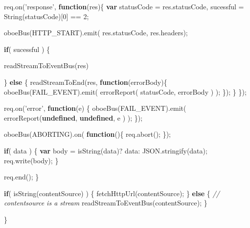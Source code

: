 \documentclass[12pt, ]{article}
\newenvironment{Shaded}{}{}
\newcommand{\KeywordTok}[1]{\textcolor[rgb]{0.00,0.44,0.13}{\textbf{{#1}}}}
\newcommand{\DecValTok}[1]{\textcolor[rgb]{0.25,0.63,0.44}{{#1}}}
\newcommand{\StringTok}[1]{\textcolor[rgb]{0.25,0.44,0.63}{{#1}}}
\newcommand{\CommentTok}[1]{\textcolor[rgb]{0.38,0.63,0.69}{\textit{{#1}}}}
\newcommand{\OtherTok}[1]{\textcolor[rgb]{0.00,0.44,0.13}{{#1}}}
\newcommand{\FunctionTok}[1]{\textcolor[rgb]{0.02,0.16,0.49}{{#1}}}
\newcommand{\NormalTok}[1]{{#1}}
\begin{document}
\begin{Shaded}
\begin{Highlighting}[]
      \OtherTok{req}\NormalTok{.}\FunctionTok{on}\NormalTok{(}\StringTok{'response'}\NormalTok{, }\KeywordTok{function}\NormalTok{(res)\{}
         \KeywordTok{var} \NormalTok{statusCode = }\OtherTok{res}\NormalTok{.}\FunctionTok{statusCode}\NormalTok{,}
             \NormalTok{sucessful = }\FunctionTok{String}\NormalTok{(statusCode)[}\DecValTok{0}\NormalTok{] == }\DecValTok{2}\NormalTok{;}
                                                   
         \FunctionTok{oboeBus}\NormalTok{(HTTP_START).}\FunctionTok{emit}\NormalTok{( }\OtherTok{res}\NormalTok{.}\FunctionTok{statusCode}\NormalTok{, }\OtherTok{res}\NormalTok{.}\FunctionTok{headers}\NormalTok{);                                }
                                
         \KeywordTok{if}\NormalTok{( sucessful ) \{          }
               
            \FunctionTok{readStreamToEventBus}\NormalTok{(res)}
            
         \NormalTok{\} }\KeywordTok{else} \NormalTok{\{}
            \FunctionTok{readStreamToEnd}\NormalTok{(res, }\KeywordTok{function}\NormalTok{(errorBody)\{}
               \FunctionTok{oboeBus}\NormalTok{(FAIL_EVENT).}\FunctionTok{emit}\NormalTok{( }
                  \FunctionTok{errorReport}\NormalTok{( statusCode, errorBody )}
               \NormalTok{);}
            \NormalTok{\});}
         \NormalTok{\}      }
      \NormalTok{\});}
      
      \OtherTok{req}\NormalTok{.}\FunctionTok{on}\NormalTok{(}\StringTok{'error'}\NormalTok{, }\KeywordTok{function}\NormalTok{(e) \{}
         \FunctionTok{oboeBus}\NormalTok{(FAIL_EVENT).}\FunctionTok{emit}\NormalTok{( }
            \FunctionTok{errorReport}\NormalTok{(}\KeywordTok{undefined}\NormalTok{, }\KeywordTok{undefined}\NormalTok{, e )}
         \NormalTok{);}
      \NormalTok{\});}
      
      \FunctionTok{oboeBus}\NormalTok{(ABORTING).}\FunctionTok{on}\NormalTok{( }\KeywordTok{function}\NormalTok{()\{              }
         \OtherTok{req}\NormalTok{.}\FunctionTok{abort}\NormalTok{();}
      \NormalTok{\});}
         
      \KeywordTok{if}\NormalTok{( data ) \{}
         \KeywordTok{var} \NormalTok{body = }\FunctionTok{isString}\NormalTok{(data)? data: }\OtherTok{JSON}\NormalTok{.}\FunctionTok{stringify}\NormalTok{(data);}
         \OtherTok{req}\NormalTok{.}\FunctionTok{write}\NormalTok{(body);}
      \NormalTok{\}}
      
      \OtherTok{req}\NormalTok{.}\FunctionTok{end}\NormalTok{();         }
   \NormalTok{\}}
   
   \KeywordTok{if}\NormalTok{( }\FunctionTok{isString}\NormalTok{(contentSource) ) \{}
      \FunctionTok{fetchHttpUrl}\NormalTok{(contentSource);}
   \NormalTok{\} }\KeywordTok{else} \NormalTok{\{}
      \CommentTok{// contentsource is a stream}
      \FunctionTok{readStreamToEventBus}\NormalTok{(contentSource);   }
   \NormalTok{\}}

\NormalTok{\}}
\end{Highlighting}
\end{Shaded}
\end{document}
